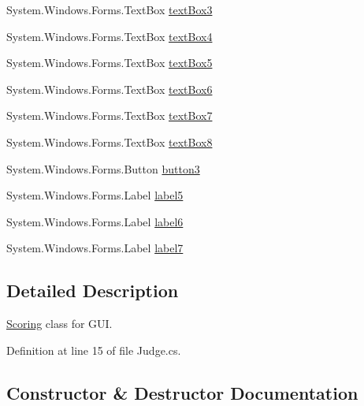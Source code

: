 \begin{DoxyCompactItemize}
\item 
System.\+Windows.\+Forms.\+Text\+Box \hyperlink{classPCO_1_1ScoringForm_ac0242c45685115aa538e839074a87e8b}{text\+Box3}
\item 
System.\+Windows.\+Forms.\+Text\+Box \hyperlink{classPCO_1_1ScoringForm_a3ad8fc2265ecc68f39e4d25a14338450}{text\+Box4}
\item 
System.\+Windows.\+Forms.\+Text\+Box \hyperlink{classPCO_1_1ScoringForm_a4bf05f9886ca9bebffd55140fd05958b}{text\+Box5}
\item 
System.\+Windows.\+Forms.\+Text\+Box \hyperlink{classPCO_1_1ScoringForm_a5dc72b565fc715ac41d3311045eef31f}{text\+Box6}
\item 
System.\+Windows.\+Forms.\+Text\+Box \hyperlink{classPCO_1_1ScoringForm_a6d4ab0e5b1a8e63a74668402ce4699a9}{text\+Box7}
\item 
System.\+Windows.\+Forms.\+Text\+Box \hyperlink{classPCO_1_1ScoringForm_a4da837774da99255a4ac562625dc3861}{text\+Box8}
\item 
System.\+Windows.\+Forms.\+Button \hyperlink{classPCO_1_1ScoringForm_aa44ea22b200c66375049d03a11606c7a}{button3}
\item 
System.\+Windows.\+Forms.\+Label \hyperlink{classPCO_1_1ScoringForm_ad4aa57ec36807843f4dd978aa5d814d8}{label5}
\item 
System.\+Windows.\+Forms.\+Label \hyperlink{classPCO_1_1ScoringForm_adcb719e8bf746507762b7af0fc5c6ae4}{label6}
\item 
System.\+Windows.\+Forms.\+Label \hyperlink{classPCO_1_1ScoringForm_a804a9b685d839e8e47fca901792a86e2}{label7}
\end{DoxyCompactItemize}


\subsection{Detailed Description}
\hyperlink{classScoring}{Scoring} class for G\+UI. 

Definition at line 15 of file Judge.\+cs.



\subsection{Constructor \& Destructor Documentation}
\mbox{\label{classPCO_1_1ScoringForm_a9d3e3721f134840aac3fadb4637dbc20}} 
